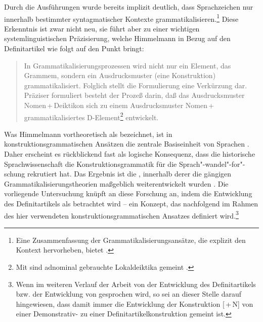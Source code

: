 Durch die Ausführungen wurde bereits implizit deutlich, dass Sprachzeichen nur innerhalb bestimmter syntagmatischer Kontexte grammatikalisieren.\footnote{Eine Zusammenfassung der Grammatikalisierungsansätze, die explizit den Kontext hervorheben, bietet \textcite{Traugott2003,Traugott2008a}.} 
Diese Erkenntnis ist zwar nicht neu, sie führt aber zu einer wichtigen systemlinguistischen Präzisierung, welche Himmelmann in Bezug auf den Definitartikel wie folgt auf den Punkt bringt: \blockcquote[31]{Himmelmann1997}{In Grammatikalisierungsprozessen wird nicht nur ein Element, das Grammem, sondern ein Ausdrucksmuster (eine Konstruktion) grammatikalisiert. Folglich stellt die Formulierung  eine Verkürzung dar. Präziser formuliert besteht der Prozeß darin, daß das Ausdrucksmuster Nomen\,+\,Deiktikon sich zu einem Ausdrucksmuster Nomen\,+\,grammatikalisiertes D-Element\footnote{Mit  sind adnominal gebrauchte Lokaldeiktika gemeint \parencite[6]{Himmelmann1997}.} 
 entwickelt.} 
Was Himmelmann vortheoretisch als  bezeichnet, ist in konstruktionsgrammatischen Ansätzen die zentrale Basiseinheit von Sprachen \parencite[s. u.a.][]{Goldberg1995,Goldberg2006}. Daher erscheint es rückblickend fast als logische Konsequenz, dass die historische Sprachwissenschaft die Konstruktionsgrammatik für die Sprach"-wandel"-for"-schung rekrutiert hat. Das Ergebnis ist die  \parencite[vgl. u.a.][]{Barddal2015}, innerhalb derer die gängigen Grammatikalisierungstheorien maßgeblich weiterentwickelt wurden \parencite[s. hierzu u.a.][]{Traugott2003,Bergs2008,Diewald2008,Fried2013,Traugott2013}. Die vorliegende Untersuchung knüpft an diese Forschung an, indem die Entwicklung des Definitartikels als  betrachtet wird -- ein Konzept, das nachfolgend im Rahmen des hier verwendeten konstruktionsgrammatischen Ansatzes definiert wird.\footnote{Wenn im weiteren Verlauf der Arbeit von der Entwicklung des Definitartikels bzw. der Entwicklung von  gesprochen wird, so sei an dieser Stelle darauf hingewiesen, dass damit immer die Entwicklung der Konstruktion [\,+\,N] von einer Demonstrativ- zu einer Definitartikelkonstruktion gemeint ist.}  

